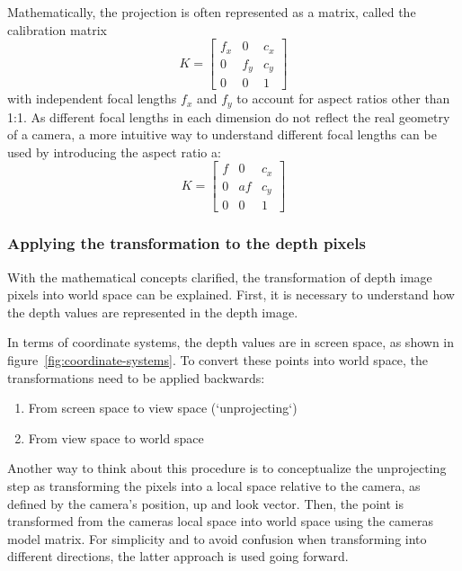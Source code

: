 Mathematically, the projection is often represented as a matrix, called the calibration matrix
\begin{equation}
    K = \begin{bmatrix}
            f_x & 0   & c_x \\
            0   & f_y & c_y \\
            0   & 0   & 1
    \end{bmatrix}
\end{equation}
with independent focal lengths $f_x$ and $f_y$ to account for aspect ratios other than 1:1.
As different focal lengths in each dimension do not reflect the real geometry of a camera,
a more intuitive way to understand different focal lengths can be used by introducing the aspect ratio a:
\begin{equation}
    K = \begin{bmatrix}
            f & 0  & c_x \\
            0 & af & c_y \\
            0 & 0  & 1
    \end{bmatrix}
\end{equation}
\parencite{szeliski_computer_2022}

\subsubsection{Applying the transformation to the depth pixels}
With the mathematical concepts clarified, the transformation of depth image pixels into world space can be explained.
First, it is necessary to understand how the depth values are represented in the depth image.

In terms of coordinate systems, the depth values are in screen space, as shown in figure~\ref{fig:coordinate-systems}.
To convert these points into world space, the transformations need to be applied backwards:
\begin{enumerate}
    \item From screen space to view space (`unprojecting`)
    \item From view space to world space
\end{enumerate}
Another way to think about this procedure is to conceptualize the unprojecting step as transforming the pixels into a local space
relative to the camera, as defined by the camera's position, up and look vector.
Then, the point is transformed from the cameras local space into world space using the cameras model matrix.
For simplicity and to avoid confusion when transforming into different directions, the latter approach is used going forward.

